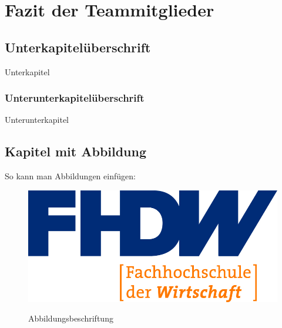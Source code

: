 \section{Fazit der Teammitglieder}
\label{instal}

\subsection{Unterkapitelüberschrift}

Unterkapitel

\subsubsection{Unterunterkapitelüberschrift}

Unterunterkapitel

\subsection{Kapitel mit Abbildung}

So kann man Abbildungen einfügen:

\begin{figure}[hbt]
\centering
\begin{minipage}[t]{1\textwidth} %
\caption{Abbildungsbeschriftung} %
\includegraphics[width=1\textwidth]{img/fhdw}\\ %
\end{minipage}
\end{figure}

